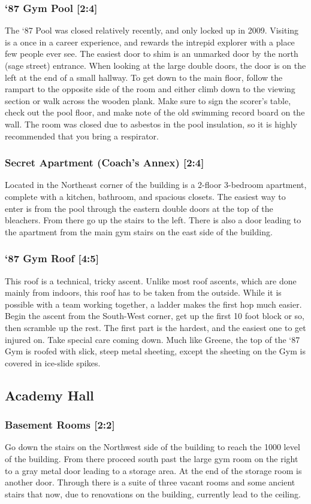 \documentclass{article}
\begin{document}
\subsubsection{‘87 Gym Pool [2:4]}
The ‘87 Pool was closed relatively recently, and only locked up in 2009. Visiting is a once in a career experience, and rewards the intrepid explorer with a place few people ever see. The easiest door to shim is an unmarked door by the north (sage street) entrance. When looking at the large double doors, the door is on the left at the end of a small hallway. To get down to the main floor, follow the rampart to the opposite side of the room and either climb down to the viewing section or walk across the wooden plank. Make sure to sign the scorer’s table, check out the pool floor, and make note of the old swimming record board on the wall. The room was closed due to asbestos in the pool insulation, so it is highly recommended that you bring a respirator.
\subsubsection{Secret Apartment (Coach’s Annex) [2:4]}
Located in the Northeast corner of the building is a 2-floor 3-bedroom apartment, complete with a kitchen, bathroom, and spacious closets. The easiest way to enter is from the pool through the eastern double doors at the top of the bleachers. From there go up the stairs to the left. There is also a door leading to the apartment from the main gym stairs on the east side of the building.
\subsubsection{‘87 Gym Roof [4:5]}
This roof is a technical, tricky ascent. Unlike most roof ascents, which are done mainly from indoors, this roof has to be taken from the outside. While it is possible with a team working together, a ladder makes the first hop much easier. Begin the ascent from the South-West corner, get up the first 10 foot block or so, then scramble up the rest. The first part is the hardest, and the easiest one to get injured on. Take special care coming down. Much like Greene, the top of the ‘87 Gym is roofed with slick, steep metal sheeting, except the sheeting on the Gym is covered in ice-slide spikes.


\pagebreak
\subsection{Academy Hall}
\subsubsection{Basement Rooms [2:2]}
Go down the stairs on the Northwest side of the building to reach the 1000 level of the building. From there proceed south past the large gym room on the right to a gray metal door leading to a storage area. At the end of the storage room is another door. Through there is a suite of three vacant rooms and some ancient stairs that now, due to renovations on the building, currently lead to the ceiling.
\end{document}
